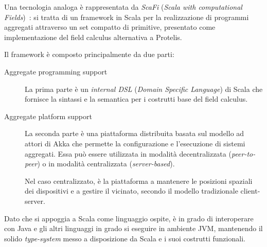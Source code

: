 Una tecnologia analoga è rappresentata da \emph{ScaFi} (\emph{\emph{Sca}la with computational \emph{Fi}elds})~\cite{aggregatescala-pmldc2016}:
si tratta di un framework in Scala per la realizzazione di programmi aggregati attraverso un set compatto di primitive, presentato come implementazione del field calculus alternativa a Protelis.

Il framework è composto principalmente da due parti:

\begin{description}
  \item[Aggregate programming support]
    La prima parte è un \emph{internal DSL} (\emph{Domain Specific Language}) di Scala che fornisce la sintassi e la semantica per i costrutti base del field calculus.

  \item[Aggregate platform support]
    La seconda parte è una piattaforma distribuita basata sul modello ad attori di Akka che permette la configurazione e l'esecuzione di sistemi aggregati.
    Essa può essere utilizzata in modalità decentralizzata (\emph{peer-to-peer}) %
    o in modalità centralizzata (\emph{server-based}).%



    Nel caso centralizzato, è la piattaforma a mantenere le posizioni spaziali dei dispositivi e a gestire il vicinato, secondo il modello tradizionale client-server.
\end{description}

Dato che si appoggia a Scala come linguaggio ospite, è in grado di interoperare con Java e gli altri linguaggi in grado si eseguire in ambiente JVM, mantenendo il solido \emph{type-system} messo a disposizione da Scala e i suoi costrutti funzionali.
